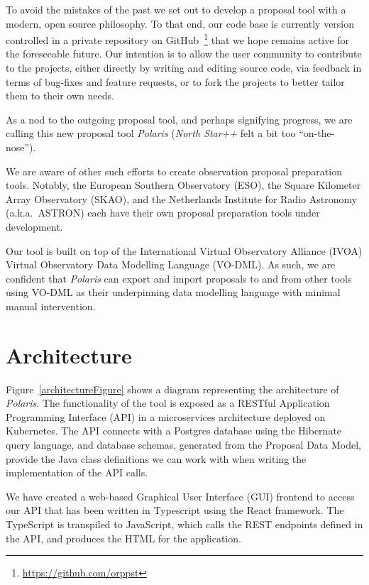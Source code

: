 \documentclass[11pt,twoside]{article}
\begin{document}
To avoid the mistakes of the past we set out to develop a proposal tool with a modern, open source philosophy.
To that end, our code base is currently version controlled in a private repository on
GitHub~\footnote{\url{https://github.com/orppst}} that we hope remains active for the foreseeable future.
Our intention is to allow the user community to contribute to the projects, either directly by writing and
editing source code, via feedback in terms of bug-fixes and feature requests, or to fork the projects to
better tailor them to their own needs.

As a nod to the outgoing proposal tool, and perhaps signifying progress, we are calling this new proposal tool
\emph{Polaris} (\emph{North Star++} felt a bit too ``on-the-nose'').

We are aware of other such efforts to create observation proposal preparation tools.
Notably, the European Southern Observatory (ESO), the Square Kilometer Array Observatory (SKAO), and the
Netherlands Institute for Radio Astronomy (a.k.a.\ ASTRON) each have their own proposal preparation tools
under development.

Our tool is built on top of the International Virtual Observatory Alliance (IVOA) Virtual
Observatory Data Modelling Language (VO-DML).
As such, we are confident that \emph{Polaris} can export and import proposals to and from other tools using
VO-DML as their underpinning data modelling language with minimal manual intervention.

\section{Architecture}\label{sec:architecture}

Figure~\ref{architectureFigure} shows a diagram representing the architecture of \emph{Polaris}.
The functionality of the tool is exposed as a RESTful Application Programming Interface (API) in a
microservices architecture deployed on Kubernetes.
The API connects with a Postgres database using the Hibernate query language, and database schemas, generated
from the Proposal Data Model, provide the Java class definitions we can work with when writing the implementation
of the API calls.


\clearpage

We have created a web-based Graphical User Interface (GUI) frontend to access our API that has been
written in Typescript using the React framework.
The TypeScript is transpiled to JavaScript, which calls the REST endpoints defined in the API, and produces the
HTML for the application.
\end{document}
